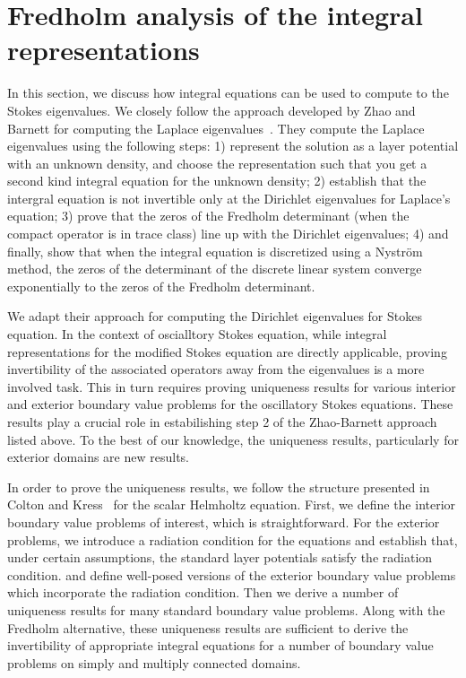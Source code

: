 \section{Fredholm analysis of the integral representations}

In this section, we discuss how integral equations
can be used to compute to the Stokes eigenvalues.
%
We closely follow the approach developed by Zhao and Barnett
for computing the Laplace eigenvalues~\cite{zhao2015robust}.
%
They compute the Laplace eigenvalues using the following
steps: 1) represent the solution 
as a layer potential with 
an unknown density, and choose the representation such that
you get a second kind integral equation for the unknown density;
2) establish that the intergral equation is not invertible 
only at the Dirichlet eigenvalues for Laplace's equation;
3) prove that the zeros of the Fredholm determinant 
(when the compact operator is in trace class) 
line up with the Dirichlet eigenvalues; 
4) and finally, show that when the integral equation
is discretized using a Nystr\"{o}m method, the zeros of 
the determinant 
of the discrete linear system 
converge exponentially
to the zeros of the Fredholm determinant. 


We adapt their approach for computing the 
Dirichlet eigenvalues for Stokes equation. 
In the context of oscialltory Stokes equation,
while integral representations for the modified
Stokes equation are directly applicable, 
proving invertibility of the associated operators
away from the eigenvalues is a more involved task.
This in turn requires proving uniqueness results
for various interior and exterior boundary value problems
for the oscillatory Stokes equations.
These results play a crucial role in estabilishing step
2 of the Zhao-Barnett approach listed above.
To the best of our knowledge, the uniqueness results, particularly
for exterior domains are new results. 


In order to prove the uniqueness results, we follow the 
structure presented in Colton and Kress~\cite[Ch. 3]{colton1983integral}
for the scalar Helmholtz equation.
%
First, we define the interior boundary value problems
of interest, which is straightforward.
%
For the exterior problems, we introduce a radiation condition
for the equations and establish that, under certain assumptions,
the standard layer potentials satisfy the radiation condition.
and define well-posed versions of the
exterior boundary value problems which incorporate the
radiation condition.
%
Then we derive a number of uniqueness
results for many standard boundary value problems.
%
Along with the Fredholm alternative, these uniqueness
results are sufficient to derive the invertibility of appropriate
integral equations for a number of boundary value problems
on simply and multiply connected domains.



